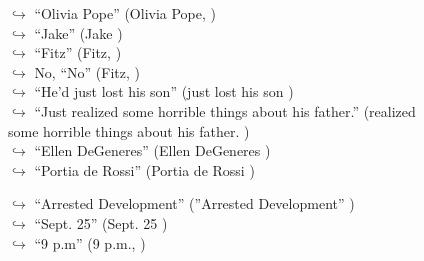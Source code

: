 \documentclass[11pt,a4paper, onecolumn]{article}
\begin{document}
\begin{figure}[t] \small \begin{tcolorbox}[boxsep=0pt,left=5pt,right=0pt,top=2pt,colback = yellow!5] \begin{dialogue}
 \small 
\colorbox{pink!25}{$\hookrightarrow$}
{ ``Olivia Pope'' (Olivia Pope, ) }
\\
\colorbox{pink!25}{$\hookrightarrow$}
{ ``Jake'' (Jake ) }
\\
\colorbox{pink!25}{$\hookrightarrow$}
{ ``Fitz'' (Fitz, ) }
\\
\colorbox{pink!25}{$\hookrightarrow$}
\colorbox{red!25}{No,}
{ ``No'' (Fitz, ) }
\\
\colorbox{pink!25}{$\hookrightarrow$}
{ ``He'd just lost his son'' (just lost his son ) }
\\
\colorbox{pink!25}{$\hookrightarrow$}
{ ``Just realized some horrible things about his father.'' (realized some horrible things about his father. ) }
\\
\colorbox{pink!25}{$\hookrightarrow$}
{ ``Ellen DeGeneres'' (Ellen DeGeneres ) }
\\
\colorbox{pink!25}{$\hookrightarrow$}
{ ``Portia de Rossi'' (Portia de Rossi ) }
 \end{dialogue}\end{tcolorbox}\end{figure}\begin{figure}[t] \small \begin{tcolorbox}[boxsep=0pt,left=5pt,right=0pt,top=2pt,colback = yellow!5] \begin{dialogue}
 \small 
\colorbox{pink!25}{$\hookrightarrow$}
{ ``Arrested Development'' (''Arrested Development'' ) }
\\
\colorbox{pink!25}{$\hookrightarrow$}
{ ``Sept. 25'' (Sept. 25 ) }
\\
\colorbox{pink!25}{$\hookrightarrow$}
{ ``9 p.m'' (9 p.m., ) }

\end{dialogue}
\end{tcolorbox}
\end{figure}
\end{document}
